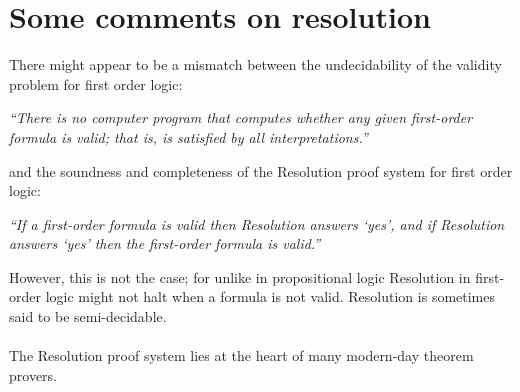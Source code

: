 \documentclass{article}[18pt]
\begin{document}
\section{Some comments on resolution}
There might appear to be a mismatch between the undecidability of the validity problem for first order logic:
\begin{center}
\textit{“There is no computer program that computes whether any given first-order formula is valid; that is, is satisfied by all interpretations.”}
\end{center}
and the soundness and completeness of the Resolution proof system for first order logic:
\begin{center}
\textit{“If a first-order formula is valid then Resolution answers ‘yes’, and if Resolution answers ‘yes’ then the first-order formula is valid.”}	
\end{center}
However, this is not the case; for unlike in propositional logic Resolution in first-order logic might not halt when a formula is not valid. Resolution is sometimes said to be semi-decidable.\\
\\
The Resolution proof system lies at the heart of many modern-day theorem provers.
\end{document}
